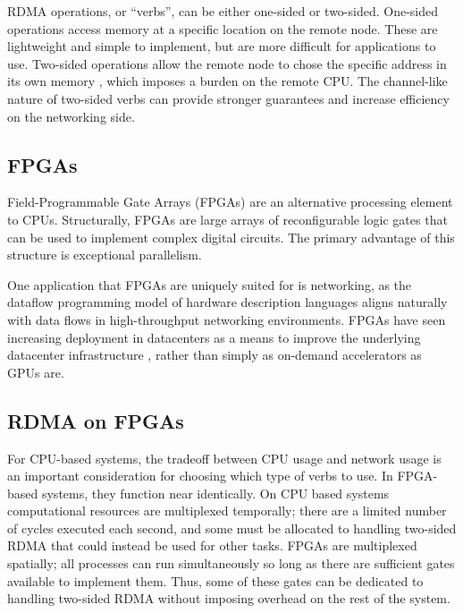 RDMA operations, or ``verbs'', can be either one-sided or two-sided. One-sided operations access memory at a specific location on the remote node. These are lightweight and simple to implement, but are more difficult for applications to use. Two-sided operations allow the remote node to chose the specific address in its own memory \cite{base}, which imposes a burden on the remote CPU. The channel-like nature of two-sided verbs can provide stronger guarantees and increase efficiency on the networking side.


\subsection{FPGAs}

Field-Programmable Gate Arrays (FPGAs) are an alternative processing element to CPUs. Structurally, FPGAs are large arrays of reconfigurable logic gates that can be used to implement complex digital circuits. The primary advantage of this structure is exceptional parallelism.

One application that FPGAs are uniquely suited for is networking, as the dataflow programming model of hardware description languages aligns naturally with data flows in high-throughput networking environments.
FPGAs have seen increasing deployment in datacenters as a means to improve the underlying datacenter infrastructure \cite{bobda-trets-2022,fang-vldb-2020}, rather than simply as on-demand accelerators as GPUs are.


\subsection{RDMA on FPGAs}

For CPU-based systems, the tradeoff between CPU usage and network usage is an important consideration for choosing which type of verbs to use. In FPGA-based systems, they function near identically. On CPU based systems computational resources are multiplexed temporally; there are a limited number of cycles executed each second, and some must be allocated to handling two-sided RDMA that could instead be used for other tasks. FPGAs are multiplexed spatially; all processes can run simultaneously so long as there are sufficient gates available to implement them. Thus, some of these gates can be dedicated to handling two-sided RDMA without imposing overhead on the rest of the system.
